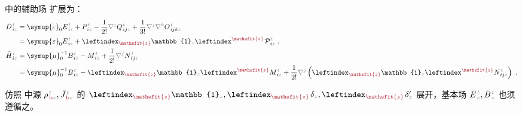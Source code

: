  中的辅助场  扩展为：
\begin{subequations}
\begin{align}
	\bar{D}^{\;\!\mathcolor{gray}{t}}_{\;\! i\mathcolor{gray}{z}} &= {\symup{\varepsilon}}_0 E^{\;\!\mathcolor{gray}{t}}_{\;\! i\mathcolor{gray}{z}} + P^{\;\!\mathcolor{gray}{t}}_{\;\! i\mathcolor{gray}{z}} - \frac{1}{2!} \mathcolor{gray}{\nabla^j} Q^{\;\!\mathcolor{gray}{t}}_{\;\! ij\mathcolor{gray}{z}} + \frac{1}{3!} \mathcolor{gray}{\nabla^j} \mathcolor{gray}{\nabla^k} O^{\;\!\mathcolor{gray}{t}}_{\;\! ijk\mathcolor{gray}{z}} \label{eq:d} \\ 
	&= {\symup{\varepsilon}}_0 E^{\;\!\mathcolor{gray}{t}}_{\;\! i\mathcolor{gray}{z}} + \leftindex_{\textcolor{Maroon}{\mathsfit{z}}} {\mathbb{1}}_{\mathcolor{gray}{z}} \leftindex^{\textcolor{Maroon}{\mathsfit{z}}} \;\! {\mathcal{P}}^{\;\!\mathcolor{gray}{t}}_{\;\! i \mathcolor{gray}{z}} ~, \label{eq:d-01} \\
	\bar{H}^{\;\!\mathcolor{gray}{t}}_{\;\! i\mathcolor{gray}{z}} &= {\symup{\mu}}_0^{-1} B^{\;\!\mathcolor{gray}{t}}_{\;\! i\mathcolor{gray}{z}} - M^{\;\!\mathcolor{gray}{t}}_{\;\! i\mathcolor{gray}{z}} + \frac{1}{2!} \mathcolor{gray}{\nabla^j} N^{\;\!\mathcolor{gray}{t}}_{\;\! ij\mathcolor{gray}{z}} \label{eq:h} \\
	&= {\symup{\mu}}_0^{-1} B^{\;\!\mathcolor{gray}{t}}_{\;\! i\mathcolor{gray}{z}} - \leftindex_{\textcolor{Maroon}{\mathsfit{z}}} {\mathbb{1}}_{\mathcolor{gray}{z}} \leftindex^{\textcolor{Maroon}{\mathsfit{z}}} M^{\;\!\mathcolor{gray}{t}}_{\;\! i\mathcolor{gray}{z}} + \frac{1}{2!} \mathcolor{gray}{\nabla^j} \left( \leftindex_{\textcolor{Maroon}{\mathsfit{z}}} {\mathbb{1}}_{\mathcolor{gray}{z}} \leftindex^{\textcolor{Maroon}{\mathsfit{z}}} N^{\;\!\mathcolor{gray}{t}}_{\;\! ij\mathcolor{gray}{z}} \right) ~. \label{eq:h-01}
\end{align}
\end{subequations}

仿照  中源 ${\rho}^{\;\!\mathcolor{gray}{t}}_{\;\!\textcolor{Maroon}{\text{b}}\mathcolor{gray}{z}},\bar{J}^{\;\!\mathcolor{gray}{t}}_{\;\!\textcolor{Maroon}{\text{b}}\mathcolor{gray}{z}}$ 的 $\leftindex_{\textcolor{Maroon}{\mathsfit{z}}} {\mathbb{1}}_{\mathcolor{gray}{z}}, \leftindex_{\textcolor{Maroon}{\mathsfit{z}}} \;\! \delta_{\mathcolor{gray}{z}}, \leftindex_{\textcolor{Maroon}{\mathsfit{z}}} \;\! \delta'_{\mathcolor{gray}{z}}$ 展开，基本场 $\bar{E}^{\;\!\mathcolor{gray}{t}}_{\;\!\mathcolor{gray}{z}}, \bar{B}^{\;\!\mathcolor{gray}{t}}_{\;\!\mathcolor{gray}{z}}$ 也须遵循之。


